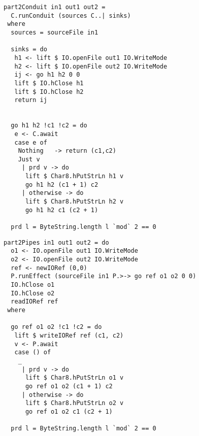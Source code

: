 % 
% 

\begin{lstlisting}[float,label=l:a:bench:part2Conduit,caption=Conduit implementation of \Hs/part2/]
part2Conduit in1 out1 out2 =
  C.runConduit (sources C..| sinks)
 where
  sources = sourceFile in1

  sinks = do
   h1 <- lift $ IO.openFile out1 IO.WriteMode
   h2 <- lift $ IO.openFile out2 IO.WriteMode
   ij <- go h1 h2 0 0
   lift $ IO.hClose h1
   lift $ IO.hClose h2
   return ij


  go h1 h2 !c1 !c2 = do
   e <- C.await
   case e of
    Nothing   -> return (c1,c2)
    Just v
     | prd v -> do
      lift $ Char8.hPutStrLn h1 v
      go h1 h2 (c1 + 1) c2
     | otherwise -> do
      lift $ Char8.hPutStrLn h2 v
      go h1 h2 c1 (c2 + 1)

  prd l = ByteString.length l `mod` 2 == 0
\end{lstlisting}

\begin{lstlisting}[float,label=l:a:bench:part2Pipes,caption=Pipes implementation of \Hs/part2/]
part2Pipes in1 out1 out2 = do
  o1 <- IO.openFile out1 IO.WriteMode
  o2 <- IO.openFile out2 IO.WriteMode
  ref <- newIORef (0,0)
  P.runEffect (sourceFile in1 P.>-> go ref o1 o2 0 0)
  IO.hClose o1
  IO.hClose o2
  readIORef ref
 where

  go ref o1 o2 !c1 !c2 = do
   lift $ writeIORef ref (c1, c2)
   v <- P.await
   case () of
    _
     | prd v -> do
      lift $ Char8.hPutStrLn o1 v
      go ref o1 o2 (c1 + 1) c2
     | otherwise -> do
      lift $ Char8.hPutStrLn o2 v
      go ref o1 o2 c1 (c2 + 1)

  prd l = ByteString.length l `mod` 2 == 0
\end{lstlisting}


